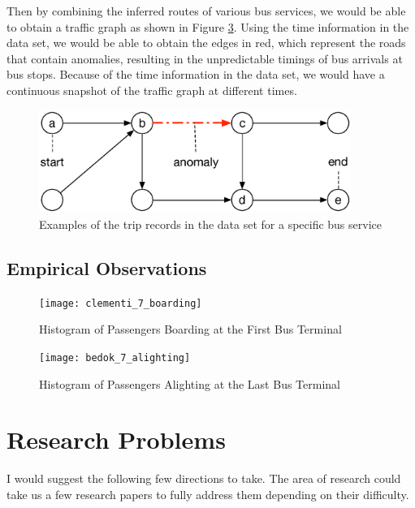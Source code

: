 \documentclass{sig-alternate}
\begin{document}
Then by combining the inferred routes of various bus services, we would be able to obtain a traffic graph as shown in Figure \ref{fig:travel_graph}. Using the time information in the data set, we would be able to obtain the edges in red, which represent the roads that contain anomalies, resulting in the unpredictable timings of bus arrivals at bus stops. Because of the time information in the data set, we would have a continuous snapshot of the traffic graph at different times.

\begin{figure}[htb]
	\centering
	\includegraphics[width=4.0in]{travel_graph}
	\caption{Examples of the trip records in the data set for a specific bus service}
	\label{fig:travel_graph}
\end{figure}

\subsection{Empirical Observations}

\begin{figure}[htb]
	\centering
	\texttt{[image: clementi\_7\_boarding]}
	\caption{Histogram of Passengers Boarding at the First Bus Terminal}
	\label{fig:travel_graph}
\end{figure}

\begin{figure}[htb]
	\centering
	\texttt{[image: bedok\_7\_alighting]}
	\caption{Histogram of Passengers Alighting at the Last Bus Terminal}
	\label{fig:travel_graph}
\end{figure}

\section{Research Problems}

I would suggest the following few directions to take. The area of research could take us a few research papers to fully address them depending on their difficulty.

\end{document}
